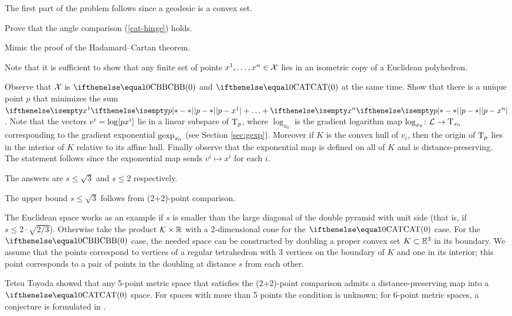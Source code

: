 The first part of the problem follows since a geodesic is a convex set.

Prove that the angle comparison (\ref{cat-hinge}) holds.

Mimic the proof of the Hadamard--Cartan theorem.

Note that it is sufficient to show that any finite set of points $x^1,\dots,x^n\in\spc{X}$ lies in an isometric copy of a Euclidean polyhedron.

Observe that $\mathcal{X}$ is $\Alex0$ and $\CAT0$ at the same time.
Show that there is a unique point $p$ that minimizes the sum $\dist{p}{x^1}{}+\dots+\dist{p}{x^n}{}$.
Note that the vectors $v^i=\mathrm{log}[{p}{x^i}]$ lie in a linear subspace of $\text{\rm T}_p$, where $\log_{x_0}$  is the gradient logarithm map $\log_{x_0}\:\spc{L}\to\T_{x_0}$ corresponding to the gradient exponential $\mathop{\rm gexp}\nolimits_{x_0}$ (see Section \ref{sec:gexp}).
Moreover if $K$ is the convex hull of $v_i$, then the origin of $\text{\rm T}_p$ lies in the interior of $K$ relative to its affine hull.
Finally observe that the exponential map is defined on all of $K$ and is distance-preserving.
The statement follows since the exponential map sends $v^i\mapsto x^i$ for each $i$.

The answers are $s\le \sqrt3$ and $s\le 2$ respectively.

The upper bound $s\le \sqrt3$ follows from (2+2)-point comparison.

The Euclidean space works as an example if $s$ is smaller than the large diagonal of the double pyramid with unit side (that is, if $s\le 2\cdot\sqrt{2/3}$).
Otherwise take the product $\spc{K}\times \RR$ with a 2-dimensional cone for the $\CAT0$ case.
For the $\Alex0$ case, the needed space can be constructed by doubling  a proper convex set $K\subset\EE^3$ in its boundary.
We assume that the points correspond to vertices of a regular tetrahedron with 3 vertices on the boundary of $K$ and one  in its interior; this point corresponds to a pair of points in the doubling at distance $s$ from each other.

Tetsu Toyoda \cite{toyoda} showed that any 5-point metric space that satisfies the (2+2)-point comparison admits a distance-preserving map into a $\CAT0$ space.
For spaces with more than 5 points the condition is unknown;
for 6-point metric spaces, a conjecture is formulated in \cite{lebedeva-petrunin-zolotov}.

